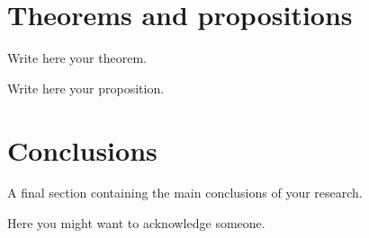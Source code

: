 \documentclass[university=polimi, master, format=summary, language=english]{academicthesis}
\begin{document}
\section{Theorems and propositions}
\begin{theorem}
  Write here your theorem.
\end{theorem}

\begin{proposition}
  Write here your proposition.
\end{proposition}

\section{Conclusions}
A final section containing the main conclusions of your research.

\begin{acknowledgements}
  Here you might want to acknowledge someone.
\end{acknowledgements}

\end{document}
